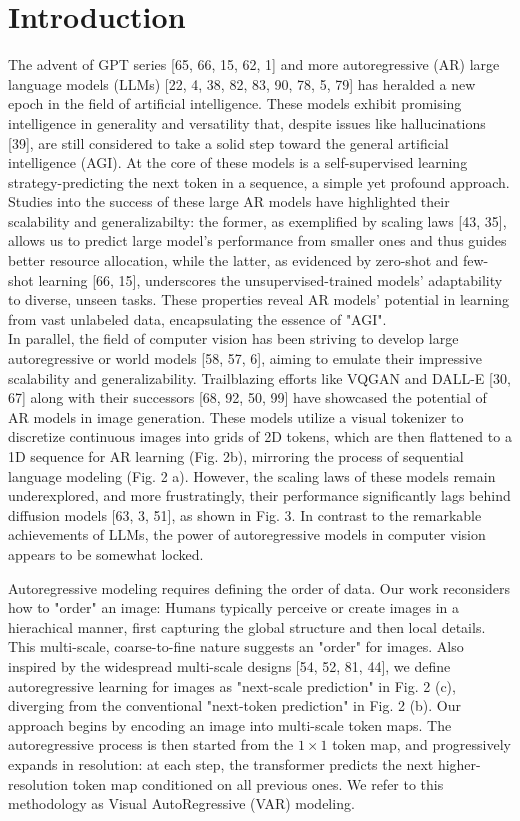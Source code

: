 \documentclass{article}
\begin{document}
\section*{Introduction}
The advent of GPT series [65, 66, 15, 62, 1] and more autoregressive (AR) large language models (LLMs) [22, 4, 38, 82, 83, 90, 78, 5, 79] has heralded a new epoch in the field of artificial intelligence. These models exhibit promising intelligence in generality and versatility that, despite issues like hallucinations [39], are still considered to take a solid step toward the general artificial intelligence (AGI). At the core of these models is a self-supervised learning strategy-predicting the next token in a sequence, a simple yet profound approach. Studies into the success of these large AR models have highlighted their scalability and generalizabilty: the former, as exemplified by scaling laws [43, 35], allows us to predict large model's performance from smaller ones and thus guides better resource allocation, while the latter, as evidenced by zero-shot and few-shot learning [66, 15], underscores the unsupervised-trained models' adaptability to diverse, unseen tasks. These properties reveal AR models' potential in learning from vast unlabeled data, encapsulating the essence of "AGI".\\[0pt]
In parallel, the field of computer vision has been striving to develop large autoregressive or world models [58, 57, 6], aiming to emulate their impressive scalability and generalizability. Trailblazing efforts like VQGAN and DALL-E [30, 67] along with their successors [68, 92, 50, 99] have showcased the potential of AR models in image generation. These models utilize a visual tokenizer to discretize continuous images into grids of 2D tokens, which are then flattened to a 1D sequence for AR learning (Fig. 2b), mirroring the process of sequential language modeling (Fig. 2 a). However, the scaling laws of these models remain underexplored, and more frustratingly, their performance significantly lags behind diffusion models [63, 3, 51], as shown in Fig. 3. In contrast to the remarkable achievements of LLMs, the power of autoregressive models in computer vision appears to be somewhat locked.

Autoregressive modeling requires defining the order of data. Our work reconsiders how to "order" an image: Humans typically perceive or create images in a hierachical manner, first capturing the global structure and then local details. This multi-scale, coarse-to-fine nature suggests an "order" for images. Also inspired by the widespread multi-scale designs [54, 52, 81, 44], we define autoregressive learning for images as "next-scale prediction" in Fig. 2 (c), diverging from the conventional "next-token prediction" in Fig. 2 (b). Our approach begins by encoding an image into multi-scale token maps. The autoregressive process is then started from the $1 \times 1$ token map, and progressively expands in resolution: at each step, the transformer predicts the next higher-resolution token map conditioned on all previous ones. We refer to this methodology as Visual AutoRegressive (VAR) modeling.
\end{document}
